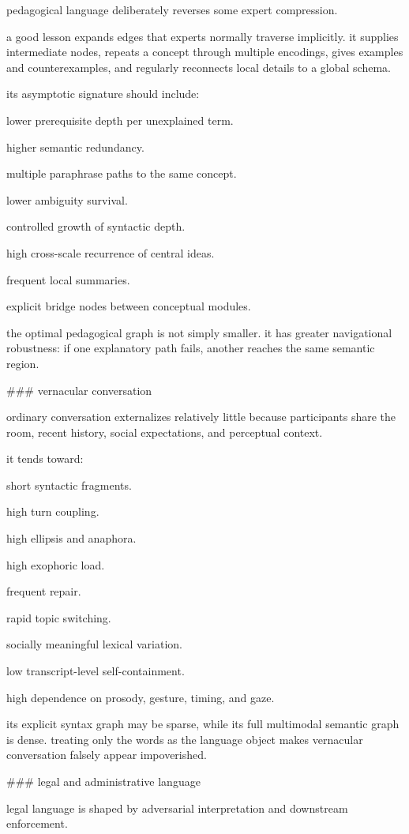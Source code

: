 pedagogical language deliberately reverses some expert compression.

a good lesson expands edges that experts normally traverse implicitly. it supplies intermediate nodes, repeats a concept through multiple encodings, gives examples and counterexamples, and regularly reconnects local details to a global schema.

its asymptotic signature should include:

lower prerequisite depth per unexplained term.

higher semantic redundancy.

multiple paraphrase paths to the same concept.

lower ambiguity survival.

controlled growth of syntactic depth.

high cross-scale recurrence of central ideas.

frequent local summaries.

explicit bridge nodes between conceptual modules.

the optimal pedagogical graph is not simply smaller. it has greater navigational robustness: if one explanatory path fails, another reaches the same semantic region.

### vernacular conversation

ordinary conversation externalizes relatively little because participants share the room, recent history, social expectations, and perceptual context.

it tends toward:

short syntactic fragments.

high turn coupling.

high ellipsis and anaphora.

high exophoric load.

frequent repair.

rapid topic switching.

socially meaningful lexical variation.

low transcript-level self-containment.

high dependence on prosody, gesture, timing, and gaze.

its explicit syntax graph may be sparse, while its full multimodal semantic graph is dense. treating only the words as the language object makes vernacular conversation falsely appear impoverished.

### legal and administrative language

legal language is shaped by adversarial interpretation and downstream enforcement.

